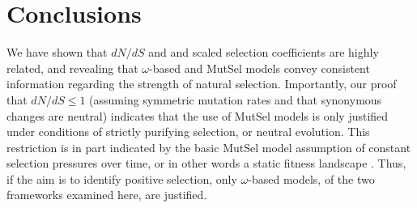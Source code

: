 \documentclass[11pt]{article}
\begin{document}






\section*{Conclusions}
We have shown that $dN/dS$ and and scaled selection coefficients are highly related, and revealing that $\omega$-based and MutSel models convey consistent information regarding the strength of natural selection. Importantly, our proof that $dN/dS \leq 1$ (assuming symmetric mutation rates and that synonymous changes are neutral) indicates that the use of MutSel models is only justified under conditions of strictly purifying selection, or neutral evolution. This restriction is in part indicated by the basic MutSel model assumption of constant selection pressures over time, or in other words a static fitness landscape \cite{HalpernBruno1998,Thorneetal2007,Rodrigueetal2010,Thorne2012}. Thus, if the aim is to identify positive selection, only $\omega$-based models, of the two frameworks examined here, are justified. 
\end{document}

